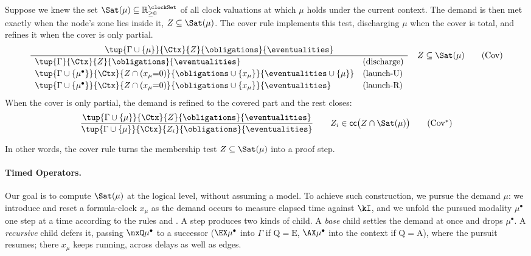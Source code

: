 Suppose we knew the set $\Sat(\mu) \subseteq \mathbb{R}_{\ge0}^{\clockSet}$ of all clock valuations at which $\mu$ holds under the current context. The demand is then met exactly when the node's zone lies inside it, $Z\subseteq\Sat(\mu)$. The cover rule  implements this test, discharging $\mu$ when the cover is total, and  refines it when the cover is only partial. 
\[
\frac{\tup{\Gamma\cup\{\mu\}}{\Ctx}{Z}{\obligations}{\eventualities}}
{\begin{array}{ll}
\tup{\Gamma}{\Ctx}{Z}{\obligations}{\eventualities} & (\text{discharge})\\[2pt]
\tup{\Gamma\cup\{\mu^\bullet\}}{\Ctx}{Z\cap(x_\mu{=}0)}{\obligations\cup\{x_\mu\}}{\eventualities\cup\{\mu\}} & (\text{launch-U})\\[2pt]
\tup{\Gamma\cup\{\mu^\bullet\}}{\Ctx}{Z\cap(x_\mu{=}0)}{\obligations\cup\{x_\mu\}}{\eventualities} & (\text{launch-R})
\end{array}}
\quad Z\subseteq\Sat(\mu)
\tag{\textrm{Cov}}\label{tag:chk}
\]
When the cover is only partial, the demand is refined to the covered part and the rest closes:
\[
\frac{\tup{\Gamma\cup\{\mu\}}{\Ctx}{Z}{\obligations}{\eventualities}}
{\tup{\Gamma\cup\{\mu\}}{\Ctx}{Z_i}{\obligations}{\eventualities}}
\qquad Z_i\in\mathsf{cc}\big(Z\cap\Sat(\mu)\big)
\tag{\textrm{Cov}$^{*}$}\label{tag:chkstar}
\]

In other words, the cover rule turns the membership test $Z\subseteq\Sat(\mu)$ into a proof step. 



\paragraph{Timed Operators.}
Our goal is to compute $\Sat(\mu)$ at the logical level, without assuming a model. To achieve such construction, we pursue the demand $\mu$: we introduce and reset a formula-clock $x_\mu$ as the demand occurs to measure elapsed time against $\kI$, and we unfold the pursued modality $\mu^\bullet$ one step at a time according to the rules  and . A step produces two kinds of child. A \emph{base} child settles the demand at once and drops $\mu^\bullet$. A \emph{recursive} child defers it, passing $\nxQ\mu^\bullet$ to a successor
($\EX\mu^\bullet$ into $\Gamma$ if $\mathrm{Q}=\mathrm{E}$, $\AX\mu^\bullet$ into the context if
$\mathrm{Q}=\mathrm{A}$), where the pursuit resumes; there $x_\mu$ keeps running, across delays as well
as edges.


